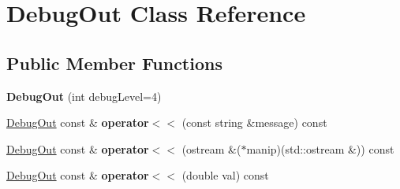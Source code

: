 \hypertarget{classDebugOut}{\section{Debug\-Out Class Reference}
\label{classDebugOut}
}
\subsection*{Public Member Functions}
\begin{DoxyCompactItemize}
\item 
\hypertarget{classDebugOut_a833f5ea5ab0d98d3fdf4a1ed8efed770}{{\bfseries Debug\-Out} (int debug\-Level=4)}\label{classDebugOut_a833f5ea5ab0d98d3fdf4a1ed8efed770}

\item 
\hypertarget{classDebugOut_aa35622f0f1b15060ad0f281de6e799b3}{\hyperlink{classDebugOut}{Debug\-Out} const \& {\bfseries operator$<$$<$} (const string \&message) const }\label{classDebugOut_aa35622f0f1b15060ad0f281de6e799b3}

\item 
\hypertarget{classDebugOut_a0b83635c229210d6000b9663575bbe99}{\hyperlink{classDebugOut}{Debug\-Out} const \& {\bfseries operator$<$$<$} (ostream \&($\ast$manip)(std\-::ostream \&)) const }\label{classDebugOut_a0b83635c229210d6000b9663575bbe99}

\item 
\hypertarget{classDebugOut_a9ab6e54c6f70bcbf18faf329952b5998}{\hyperlink{classDebugOut}{Debug\-Out} const \& {\bfseries operator$<$$<$} (double val) const }\label{classDebugOut_a9ab6e54c6f70bcbf18faf329952b5998}

\end{DoxyCompactItemize}
